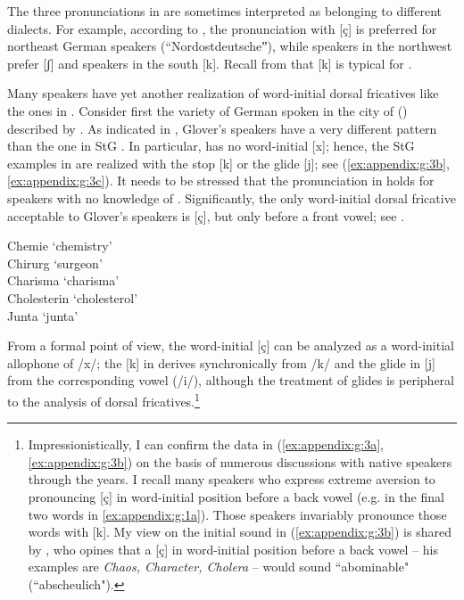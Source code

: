 The three pronunciations in  are sometimes interpreted as belonging to different dialects. For example, according to \citet[254]{Pilch1966}, the pronunciation with [ç] is preferred for northeast German speakers (“Nordostdeutscheˮ), while speakers in the northwest prefer [ʃ] and speakers in the south [k]. Recall from  that [k] is typical for .

Many speakers have yet another realization of word-initial dorsal fricatives like the ones in . Consider first the variety of German spoken in the city of  () described by \citet{Glover2014}. As indicated in , Glover’s speakers have a very different pattern than the one in StG . In particular,  has no word-initial [x]; hence, the StG examples in  are realized with the stop [k] or the glide [j]; see (\ref{ex:appendix:g:3b}, \ref{ex:appendix:g:3c}). It needs to be stressed that the pronunciation in  holds for speakers with no knowledge of . Significantly, the only word-initial dorsal fricative acceptable to Glover’s speakers is [ç], but only before a front vowel; see .

\ea%
    \label{ex:appendix:g:3}
\ea \label{ex:appendix:g:3a}
\relax  [çemiː]       \tab Chemie    \tab ‘chemistry’  \\
   \relax  [çiʀʊɐk]      \tab Chirurg   \tab  ‘surgeon’   \\
\ex \label{ex:appendix:g:3b}
\relax  [kɑːʀɪsmɑ]    \tab  Charisma \tab    ‘charisma’\\
   \relax  [kolɛsteʀiːn] \tab   Cholesterin  \tab  ‘cholesterol’\\
\ex \label{ex:appendix:g:3c}
\relax  [jʊntɑ]       \tab   Junta        \tab  ‘junta’
\z
\z

From a formal point of view, the word-initial [ç] can be analyzed as a word-initial allophone of /x/; the [k] in  derives synchronically from /k/ and the glide in [j] from the corresponding vowel (/i/), although the treatment of glides is peripheral to the analysis of dorsal fricatives.\footnote{{Impressionistically, I can confirm the data in (\ref{ex:appendix:g:3a}, \ref{ex:appendix:g:3b}) on the basis of numerous discussions with native speakers through the years. I recall many speakers who express extreme aversion to pronouncing [ç] in word-initial position before a back vowel (e.g. in the final two words in \ref{ex:appendix:g:1a}). Those speakers invariably pronounce those words with [k]. My view on the initial sound in (\ref{ex:appendix:g:3b}) is shared by \citet[32]{Rapp1841}, who opines that a [ç] in word-initial position before a back vowel -- his examples are \textit{Chaos, Character, Cholera} -- would sound “abominable" (“abscheulich").} }


